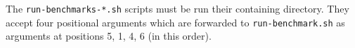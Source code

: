 \documentclass[12pt,oneside]{fithesis2}
\begin{document}
      The \verb|run-benchmarks-*.sh| scripts must be run their containing directory. They accept four positional arguments which are forwarded to \verb|run-benchmark.sh| as arguments at positions 5, 1, 4, 6 (in this order).
      
      
    
    
    
    
\end{document}
